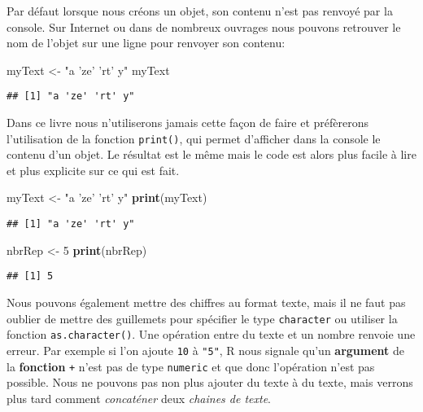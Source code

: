 \documentclass[]{book}
\newenvironment{Shaded}{\begin{snugshade}}{\end{snugshade}}
\newcommand{\KeywordTok}[1]{\textcolor[rgb]{0.13,0.29,0.53}{\textbf{#1}}}
\newcommand{\DecValTok}[1]{\textcolor[rgb]{0.00,0.00,0.81}{#1}}
\newcommand{\StringTok}[1]{\textcolor[rgb]{0.31,0.60,0.02}{#1}}
\newcommand{\NormalTok}[1]{#1}
\theoremstyle{definition}
\theoremstyle{definition}
\theoremstyle{definition}
\theoremstyle{remark}
\begin{document}
Par défaut lorsque nous créons un objet, son contenu n'est pas renvoyé
par la console. Sur Internet ou dans de nombreux ouvrages nous pouvons
retrouver le nom de l'objet sur une ligne pour renvoyer son contenu:

\begin{Shaded}
\begin{Highlighting}[]
\NormalTok{myText <-}\StringTok{ "a 'ze' 'rt' y"}
\NormalTok{myText}
\end{Highlighting}
\end{Shaded}

\begin{verbatim}
## [1] "a 'ze' 'rt' y"
\end{verbatim}

Dans ce livre nous n'utiliserons jamais cette façon de faire et
préfèrerons l'utilisation de la fonction \texttt{print()}, qui permet
d'afficher dans la console le contenu d'un objet. Le résultat est le
même mais le code est alors plus facile à lire et plus explicite sur ce
qui est fait.

\begin{Shaded}
\begin{Highlighting}[]
\NormalTok{myText <-}\StringTok{ "a 'ze' 'rt' y"}
\KeywordTok{print}\NormalTok{(myText)}
\end{Highlighting}
\end{Shaded}

\begin{verbatim}
## [1] "a 'ze' 'rt' y"
\end{verbatim}

\begin{Shaded}
\begin{Highlighting}[]
\NormalTok{nbrRep <-}\StringTok{ }\DecValTok{5}
\KeywordTok{print}\NormalTok{(nbrRep)}
\end{Highlighting}
\end{Shaded}

\begin{verbatim}
## [1] 5
\end{verbatim}

Nous pouvons également mettre des chiffres au format texte, mais il ne
faut pas oublier de mettre des guillemets pour spécifier le type
\texttt{character} ou utiliser la fonction \texttt{as.character()}. Une
opération entre du texte et un nombre renvoie une erreur. Par exemple si
l'on ajoute \texttt{10} à \texttt{"5"}, R nous signale qu'un
\textbf{argument} de la \textbf{fonction} \texttt{+} n'est pas de type
\texttt{numeric} et que donc l'opération n'est pas possible. Nous ne
pouvons pas non plus ajouter du texte à du texte, mais verrons plus tard
comment \emph{concaténer} deux \emph{chaines de texte}.
\end{document}
